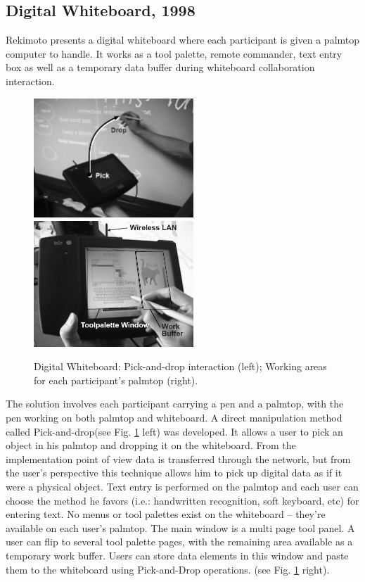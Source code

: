 \subsection{Digital Whiteboard, 1998}

Rekimoto \cite{WBOARD} presents a digital whiteboard where each participant is given
a palmtop computer to handle. It works as a tool palette, remote commander, text entry box as
well as a temporary data buffer during whiteboard collaboration interaction.

\begin{figure}[!ht]
	\centering
	\includegraphics[width=6cm]{gfx/wboard.png}
	\includegraphics[width=6cm]{gfx/wboard2.png}
	\caption{Digital Whiteboard:
		Pick-and-drop interaction (left);
		Working areas for each participant's palmtop (right).}
	\label{FIG-WBOARD}
\end{figure}

The solution involves each participant carrying a pen and a palmtop,
with the pen working on both palmtop and whiteboard.
A direct manipulation method called Pick-and-drop(see Fig. \ref{FIG-WBOARD} left) was developed.
It allows a user to pick an object in his palmtop and dropping it on the whiteboard.
From the implementation point of view data is transferred through the network,
but from the user's perspective this technique allows him to pick up digital data
as if it were a physical object.
Text entry is performed on the palmtop and each user can choose the method he favors
(i.e.: handwritten recognition, soft keyboard, etc) for entering text.
No menus or tool palettes exist on the whiteboard -- they're available on each user's palmtop.
The main window is a multi page tool panel.
A user can flip to several tool palette pages, with the remaining area available as a temporary work buffer.
Users can store data elements in this window and paste them to the whiteboard
using Pick-and-Drop operations. (see Fig. \ref{FIG-WBOARD} right).

